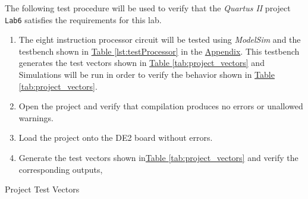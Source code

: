 The following test procedure will be used to verify that the \emph{Quartus II} project \verb|Lab6| satisfies the requirements for this lab.

\begin{enumerate}
    \item The eight instruction processor circuit will be tested using \emph{ModelSim} and the testbench shown in \hyperref[lst:testProcessor]{Table \ref*{lst:testProcessor}} in the \hyperref[sec:appendix]{Appendix}.
    This testbench generates the test vectors shown in \hyperref[tab:project_vectors]{Table \ref*{tab:project_vectors}} and %
    Simulations will be run in order to verify the behavior shown in \hyperref[tab:project_vectors]{Table \ref*{tab:project_vectors}}.
    \item Open the project and verify that compilation produces no errors or unallowed warnings.
    \item Load the project onto the DE2 board without errors.
    \item Generate the test vectors shown in\hyperref[tab:project_vectors]{Table \ref*{tab:project_vectors}} and verify the corresponding outputs,%
\end{enumerate}

\begin{table}[htbp]
    \centering
    \caption{Project Test Vectors\label{tab:project_vectors}}
\end{table}

